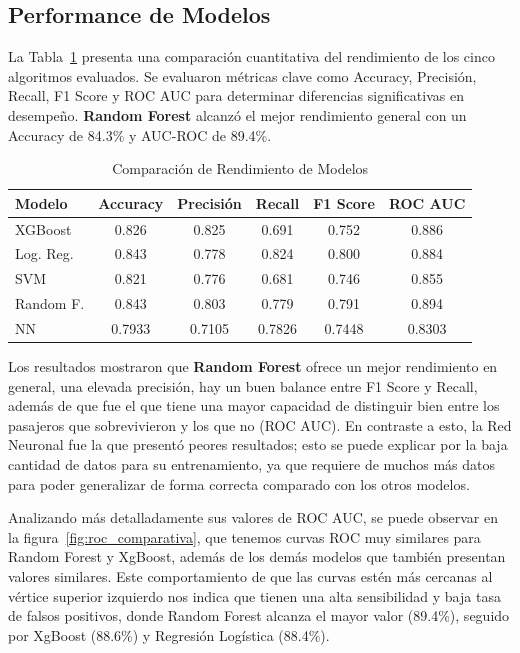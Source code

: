 \documentclass[conference]{IEEEtran}
\begin{document}
\subsection{Performance de Modelos}

La Tabla~\ref{tab:model_comparison} presenta una comparación cuantitativa del rendimiento de los cinco algoritmos evaluados. Se evaluaron métricas clave como Accuracy, Precisión, Recall, F1 Score y ROC AUC para determinar diferencias significativas en desempeño. \textbf {Random Forest} alcanzó el mejor rendimiento general con un Accuracy de 84.3\% y AUC-ROC de 89.4\%.

\begin{table}[htbp]
\caption{Comparación de Rendimiento de Modelos}
\label{tab:model_comparison}
\begin{center}
\begin{tabular}{|l|c|c|c|c|c|}
\hline
\textbf{Modelo} & \textbf{Accuracy} & \textbf{Precisión} & \textbf{Recall} & \textbf{F1 Score} & \textbf{ROC AUC} \\
\hline
XGBoost             & 0.826  & 0.825  & 0.691  & 0.752  & 0.886  \\
Log. Reg. & 0.843  & 0.778  & 0.824  & 0.800  & 0.884  \\
SVM                 & 0.821  & 0.776  & 0.681  & 0.746  & 0.855  \\
Random F.       & 0.843  & 0.803  & 0.779  & 0.791  & 0.894  \\
NN        & 0.7933 & 0.7105 & 0.7826 & 0.7448 & 0.8303 \\
\hline
\end{tabular}
\end{center}
\end{table}

Los resultados mostraron que \textbf{Random Forest} ofrece un mejor rendimiento en general, una elevada precisión, hay un buen balance entre F1 Score y Recall, además de que fue el que tiene una mayor capacidad de distinguir bien entre los pasajeros que sobrevivieron y los que no (ROC AUC).
En contraste a esto, la Red Neuronal fue la que presentó peores resultados; esto se puede explicar por la baja cantidad de datos para su entrenamiento, ya que requiere de muchos más datos para poder generalizar de forma correcta comparado con los otros modelos.

Analizando más detalladamente sus valores de ROC AUC, se puede observar en la figura~\ref{fig:roc_comparativa}, que tenemos curvas ROC muy similares para Random Forest y XgBoost, además de los demás modelos que también presentan valores similares. Este comportamiento de que las curvas estén más cercanas al vértice superior izquierdo nos indica que tienen una alta sensibilidad y baja tasa de falsos positivos, donde Random Forest alcanza el mayor valor (89.4\%), seguido por XgBoost (88.6\%) y Regresión Logística (88.4\%).
\end{document}

